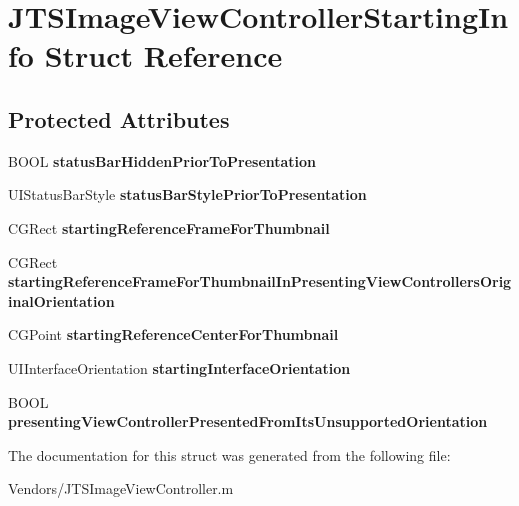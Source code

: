 \hypertarget{struct_j_t_s_image_view_controller_starting_info}{}\section{J\+T\+S\+Image\+View\+Controller\+Starting\+Info Struct Reference}
\label{struct_j_t_s_image_view_controller_starting_info}
\subsection*{Protected Attributes}
\begin{DoxyCompactItemize}
\item 
\hypertarget{struct_j_t_s_image_view_controller_starting_info_a838661729c98c5883eb7c221294a754e}{}B\+O\+O\+L {\bfseries status\+Bar\+Hidden\+Prior\+To\+Presentation}\label{struct_j_t_s_image_view_controller_starting_info_a838661729c98c5883eb7c221294a754e}

\item 
\hypertarget{struct_j_t_s_image_view_controller_starting_info_a8727b329ecf0e21f857c62c71aa53278}{}U\+I\+Status\+Bar\+Style {\bfseries status\+Bar\+Style\+Prior\+To\+Presentation}\label{struct_j_t_s_image_view_controller_starting_info_a8727b329ecf0e21f857c62c71aa53278}

\item 
\hypertarget{struct_j_t_s_image_view_controller_starting_info_a7f9b50f661ebc231d25453b243f512e8}{}C\+G\+Rect {\bfseries starting\+Reference\+Frame\+For\+Thumbnail}\label{struct_j_t_s_image_view_controller_starting_info_a7f9b50f661ebc231d25453b243f512e8}

\item 
\hypertarget{struct_j_t_s_image_view_controller_starting_info_a2eeed515fb55617bb5517e9bb71620c7}{}C\+G\+Rect {\bfseries starting\+Reference\+Frame\+For\+Thumbnail\+In\+Presenting\+View\+Controllers\+Original\+Orientation}\label{struct_j_t_s_image_view_controller_starting_info_a2eeed515fb55617bb5517e9bb71620c7}

\item 
\hypertarget{struct_j_t_s_image_view_controller_starting_info_a911ee3e0418452489e4682bff4b8b92a}{}C\+G\+Point {\bfseries starting\+Reference\+Center\+For\+Thumbnail}\label{struct_j_t_s_image_view_controller_starting_info_a911ee3e0418452489e4682bff4b8b92a}

\item 
\hypertarget{struct_j_t_s_image_view_controller_starting_info_a3c1a50290de783857ee67666567e920c}{}U\+I\+Interface\+Orientation {\bfseries starting\+Interface\+Orientation}\label{struct_j_t_s_image_view_controller_starting_info_a3c1a50290de783857ee67666567e920c}

\item 
\hypertarget{struct_j_t_s_image_view_controller_starting_info_a5810c850e5fa3cc4ce3024fd143a0c03}{}B\+O\+O\+L {\bfseries presenting\+View\+Controller\+Presented\+From\+Its\+Unsupported\+Orientation}\label{struct_j_t_s_image_view_controller_starting_info_a5810c850e5fa3cc4ce3024fd143a0c03}

\end{DoxyCompactItemize}


The documentation for this struct was generated from the following file\+:\begin{DoxyCompactItemize}
\item 
Vendors/J\+T\+S\+Image\+View\+Controller.\+m\end{DoxyCompactItemize}
